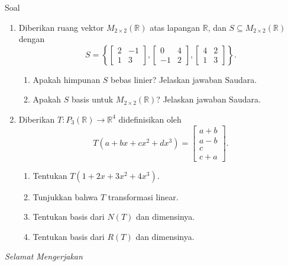 \documentclass[11pt,a4paper]{article}
\newcommand{\R}{\mathbb{R}}
\begin{document}
\begin{center}
  Soal
\end{center}
\begin{enumerate}[series=soal]
  \item Diberikan ruang vektor $M_{2\times2}(\R)$ atas lapangan $\R$,
        dan $S\subseteq M_{2\times2}(\R)$ dengan
        \[
          S=\left\{
          \begin{bmatrix}2&-1\\1&3\end{bmatrix},
          \begin{bmatrix}0&4\\-1&2\end{bmatrix},
          \begin{bmatrix}4&2\\1&3\end{bmatrix}
          \right\}.
        \]
        \begin{enumerate}
          \item Apakah himpunan $S$ bebas linier? Jelaskan jawaban Saudara.
          \item Apakah $S$ basis untuk $M_{2\times2}(\R)$? Jelaskan jawaban Saudara.
        \end{enumerate}

  \item Diberikan $T:P_3(\R)\to\R^4$ didefinisikan oleh
        \[
          T(a+bx+cx^2+dx^3)=\begin{bmatrix}a+b\\a-b\\c\\c+a\end{bmatrix}.
        \]
        \begin{enumerate}
          \item Tentukan $T(1+2x+3x^2+4x^3)$.
          \item Tunjukkan bahwa $T$ transformasi linear.
          \item Tentukan basis dari $N(T)$ dan dimensinya.
          \item Tentukan basis dari $R(T)$ dan dimensinya.
        \end{enumerate}
\end{enumerate}

\vfill
\begin{center}
  \textit{Selamat Mengerjakan}
\end{center}
\newpage
\end{document}
